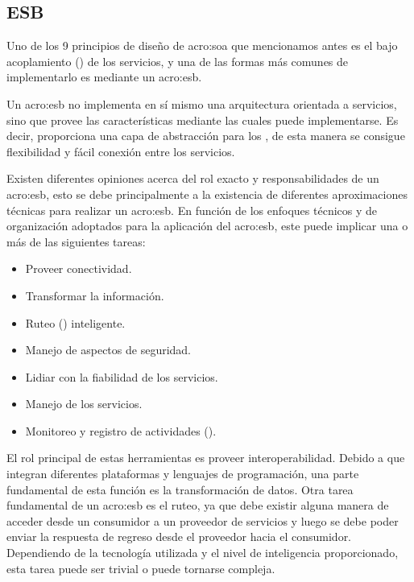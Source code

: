 
\subsection{ESB}
\label{esb:introduccion}


Uno de los 9 principios de diseño de \gls{acro:soa} que mencionamos antes es el bajo acoplamiento () de los servicios, y una de las formas más comunes de implementarlo es mediante un \gls{acro:esb}.

Un \gls{acro:esb} no implementa en sí mismo una arquitectura orientada a servicios, sino que provee las características mediante las cuales puede implementarse. Es decir, proporciona una capa de abstracción para los , de esta manera se consigue flexibilidad y fácil conexión entre los servicios.

Existen diferentes opiniones acerca del rol exacto y responsabilidades de un \gls{acro:esb}, esto se debe principalmente a la existencia de diferentes aproximaciones técnicas para realizar un \gls{acro:esb}\cite[p.~47]{josuttis2007}.  En función de los enfoques técnicos y de organización adoptados para la aplicación del \gls{acro:esb}, este puede implicar una o más de las siguientes tareas:

\begin{itemize}
  \item Proveer conectividad.
  \item Transformar la información.
  \item Ruteo () inteligente.
  \item Manejo de aspectos de seguridad.
  \item Lidiar con la fiabilidad de los servicios.
  \item Manejo de los servicios.
  \item Monitoreo y registro de actividades ().
\end{itemize}

El rol principal de estas herramientas es proveer interoperabilidad. Debido a que integran diferentes plataformas y lenguajes de programación, una parte fundamental de esta función es la transformación de datos.
Otra tarea fundamental de un \gls{acro:esb} es el ruteo, ya que debe existir alguna manera de acceder desde un consumidor a un proveedor de servicios y luego se debe poder enviar la respuesta de regreso desde el proveedor hacia el consumidor. Dependiendo de la tecnología utilizada y el nivel de inteligencia proporcionado, esta tarea puede ser trivial o puede tornarse compleja.

